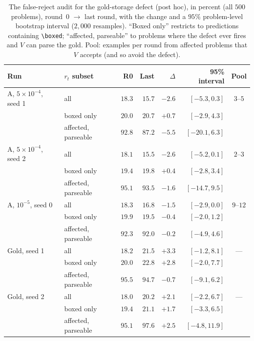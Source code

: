 \documentclass[runningheads]{llncs}
\begin{document}
\begin{table}[!htb]
\caption{The false-reject audit for the gold-storage defect (post hoc), in
percent (all $500$ problems), round~0 $\to$ last round, with the change and a $95\%$ problem-level bootstrap interval ($2{,}000$
resamples). ``Boxed only'' restricts to predictions containing
\texttt{\textbackslash boxed}; ``affected, parseable'' to problems where the
defect ever fires and $V$ can parse the gold. Pool: examples per round from
affected problems that $V$ accepts (and so avoid the defect).}
\label{tab:rt}
\centering
\footnotesize
\setlength{\tabcolsep}{4pt}
\begin{tabular}{llrrrrc}
\toprule
Run & $r_t$ subset & R0 & Last & $\Delta$ & 95\% interval & Pool \\
\midrule
A, $5\times10^{-4}$, seed 1 & all & $18.3$ & $15.7$ & $-2.6$ & $[-5.3, 0.3]$ & $3$--$5$ \\
 & boxed only & $20.0$ & $20.7$ & $+0.7$ & $[-2.9, 4.3]$ & \\
 & affected, parseable & $92.8$ & $87.2$ & $-5.5$ & $[-20.1, 6.3]$ & \\
\addlinespace
A, $5\times10^{-4}$, seed 2 & all & $18.1$ & $15.5$ & $-2.6$ & $[-5.2, 0.1]$ & $2$--$3$ \\
 & boxed only & $19.4$ & $19.8$ & $+0.4$ & $[-2.8, 3.4]$ & \\
 & affected, parseable & $95.1$ & $93.5$ & $-1.6$ & $[-14.7, 9.5]$ & \\
\addlinespace
A, $10^{-5}$, seed 0 & all & $18.3$ & $16.8$ & $-1.5$ & $[-2.9, 0.0]$ & $9$--$12$ \\
 & boxed only & $19.9$ & $19.5$ & $-0.4$ & $[-2.0, 1.2]$ & \\
 & affected, parseable & $92.3$ & $92.0$ & $-0.2$ & $[-4.9, 4.6]$ & \\
\addlinespace
Gold, seed 1 & all & $18.2$ & $21.5$ & $+3.3$ & $[-1.2, 8.1]$ & --- \\
 & boxed only & $20.0$ & $22.8$ & $+2.8$ & $[-2.0, 7.7]$ & \\
 & affected, parseable & $95.5$ & $94.7$ & $-0.7$ & $[-9.1, 6.2]$ & \\
\addlinespace
Gold, seed 2 & all & $18.0$ & $20.2$ & $+2.1$ & $[-2.2, 6.7]$ & --- \\
 & boxed only & $19.4$ & $21.1$ & $+1.7$ & $[-3.3, 6.5]$ & \\
 & affected, parseable & $95.1$ & $97.6$ & $+2.5$ & $[-4.8, 11.9]$ & \\
\bottomrule
\end{tabular}
\end{table}
\end{document}
